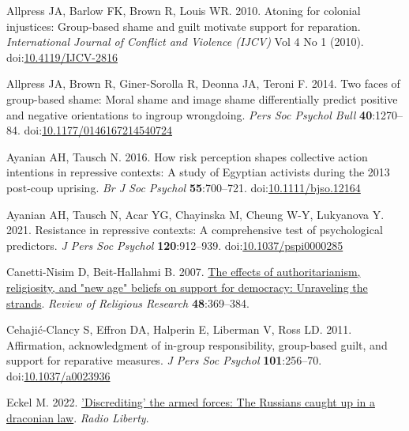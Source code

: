 \documentclass[
]{article}
\newlength{\cslhangindent}
\newlength{\cslentryspacingunit} %
\newenvironment{CSLReferences}[2] %
 {%
  \setlength{\parindent}{0pt}
  \ifodd #1
  \let\oldpar\par
  \def\par{\hangindent=\cslhangindent\oldpar}
  \fi
  \setlength{\parskip}{#2\cslentryspacingunit}
 }%
 {}
\begin{document}
\hypertarget{refs}{}
\begin{CSLReferences}{1}{0}
\leavevmode{}%
Allpress JA, Barlow FK, Brown R, Louis WR. 2010. Atoning for colonial injustices: Group-based shame and guilt motivate support for reparation. \emph{International Journal of Conflict and Violence (IJCV)} Vol 4 No 1 (2010). doi:\href{https://doi.org/10.4119/IJCV-2816}{10.4119/IJCV-2816}

\leavevmode{}%
Allpress JA, Brown R, Giner-Sorolla R, Deonna JA, Teroni F. 2014. Two faces of group-based shame: Moral shame and image shame differentially predict positive and negative orientations to ingroup wrongdoing. \emph{Pers Soc Psychol Bull} \textbf{40}:1270--84. doi:\href{https://doi.org/10.1177/0146167214540724}{10.1177/0146167214540724}

\leavevmode{}%
Ayanian AH, Tausch N. 2016. How risk perception shapes collective action intentions in repressive contexts: A study of {Egyptian} activists during the 2013 post-coup uprising. \emph{Br J Soc Psychol} \textbf{55}:700--721. doi:\href{https://doi.org/10.1111/bjso.12164}{10.1111/bjso.12164}

\leavevmode{}%
Ayanian AH, Tausch N, Acar YG, Chayinska M, Cheung W-Y, Lukyanova Y. 2021. Resistance in repressive contexts: A comprehensive test of psychological predictors. \emph{J Pers Soc Psychol} \textbf{120}:912--939. doi:\href{https://doi.org/10.1037/pspi0000285}{10.1037/pspi0000285}

\leavevmode{}%
Canetti-Nisim D, Beit-Hallahmi B. 2007. \href{http://www.jstor.org/stable/20447457}{The effects of authoritarianism, religiosity, and "new age" beliefs on support for democracy: Unraveling the strands}. \emph{Review of Religious Research} \textbf{48}:369--384.

\leavevmode{}%
Cehajić-Clancy S, Effron DA, Halperin E, Liberman V, Ross LD. 2011. Affirmation, acknowledgment of in-group responsibility, group-based guilt, and support for reparative measures. \emph{J Pers Soc Psychol} \textbf{101}:256--70. doi:\href{https://doi.org/10.1037/a0023936}{10.1037/a0023936}

\leavevmode{}%
Eckel M. 2022. \href{https://www.rferl.org/a/russia-ukraine-war-discrediting-armed-forces-law/31875273.html}{'Discrediting' the armed forces: The {Russians} caught up in a draconian law}. \emph{Radio Liberty}.


\end{CSLReferences}
\end{document}
